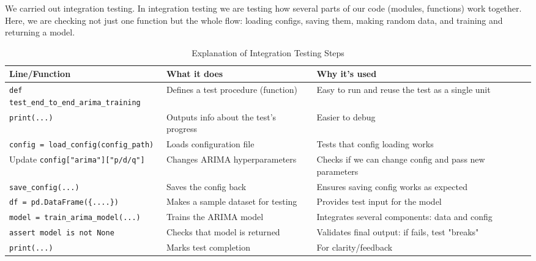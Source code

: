 We carried out integration testing. In integration testing we are testing how several parts of our code (modules, functions) work together. Here, we are checking not just one function but the whole flow: loading configs, saving them, making random data, and training and returning a model.

\renewcommand{\arraystretch}{1.4} %

\begin{table}[H]
	\centering
	\caption{Explanation of Integration Testing Steps}
	\begin{tabularx}{\textwidth}{|l|X|X|}
		\hline
		\textbf{Line/Function} & \textbf{What it does} & \textbf{Why it’s used} \\
		\hline
		\texttt{def test\_end\_to\_end\_arima\_training} & Defines a test procedure (function) & Easy to run and reuse the test as a single unit \\
		\hline
		\texttt{print(...)} & Outputs info about the test’s progress & Easier to debug \\
		\hline
		\texttt{config = load\_config(config\_path)} & Loads configuration file & Tests that config loading works \\
		\hline
		Update \texttt{config["arima"]["p/d/q"]} & Changes ARIMA hyperparameters & Checks if we can change config and pass new parameters \\
		\hline
		\texttt{save\_config(...)} & Saves the config back & Ensures saving config works as expected \\
		\hline
		\texttt{df = pd.DataFrame(\{....\})} & Makes a sample dataset for testing & Provides test input for the model \\
		\hline
		\texttt{model = train\_arima\_model(...)} & Trains the ARIMA model & Integrates several components: data and config \\
		\hline
		\texttt{assert model is not None} & Checks that model is returned & Validates final output: if fails, test "breaks" \\
		\hline
		\texttt{print(...)} & Marks test completion & For clarity/feedback \\
		\hline
	\end{tabularx}
\end{table}

